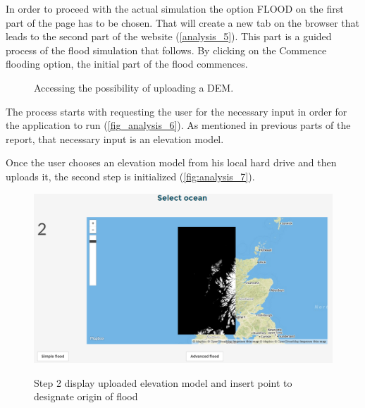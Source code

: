 In order to proceed with the actual simulation the option FLOOD on the first part of the page has to be chosen. That will create a new tab on the browser that leads to the second part of the website (\autoref{analysis_5}). This part is a guided process of the flood simulation that follows. By clicking on the Commence flooding option, the initial part of the flood commences.

\begin{figure}[h!]
  \myfloatalign
   \quad
   \quad
 \caption{Accessing the possibility of uploading a DEM.}
 \label{fig:analysis_upload}
\end{figure}

The process starts with requesting the user for the necessary input in order for the application to run (\autoref{fig_analysis_6}). As mentioned in previous parts of the report, that necessary input is an elevation model. 

Once the user chooses an elevation model from his local hard drive and then uploads it, the second step is initialized (\autoref{fig:analysis_7}). 


\begin{figure}[h!]
\centering
	{\includegraphics[width=\linewidth]{gfx/Analysis_Website/7.png}}
\caption{Step 2 display uploaded elevation model and insert point to designate origin of flood}
\label{fig:analysis_7}
\end{figure}

